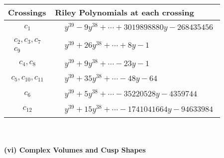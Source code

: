 \documentclass[1p]{elsarticle_modified}
\theoremstyle{definition}
\begin{document}
\begin{tabular}{m{50pt}|m{274pt}}
Crossings & \hspace{64pt}Riley Polynomials at each crossing \\
\hline $$\begin{aligned}c_{1}\end{aligned}$$&$\begin{aligned}
&y^{39}-9 y^{38}+\cdots+3019898880 y-268435456
\end{aligned}$\\
\hline $$\begin{aligned}c_{2},c_{3},c_{7}\\c_{9}\end{aligned}$$&$\begin{aligned}
&y^{39}+26 y^{38}+\cdots+8 y-1
\end{aligned}$\\
\hline $$\begin{aligned}c_{4},c_{8}\end{aligned}$$&$\begin{aligned}
&y^{39}+9 y^{38}+\cdots-23 y-1
\end{aligned}$\\
\hline $$\begin{aligned}c_{5},c_{10},c_{11}\end{aligned}$$&$\begin{aligned}
&y^{39}+35 y^{38}+\cdots-48 y-64
\end{aligned}$\\
\hline $$\begin{aligned}c_{6}\end{aligned}$$&$\begin{aligned}
&y^{39}+5 y^{38}+\cdots-35220528 y-4359744
\end{aligned}$\\
\hline $$\begin{aligned}c_{12}\end{aligned}$$&$\begin{aligned}
&y^{39}+15 y^{38}+\cdots-1741041664 y-94633984
\end{aligned}$\\
\hline
\end{tabular}\\~\\
\newpage\flushleft \textbf{(vi) Complex Volumes and Cusp Shapes}
\end{document}
